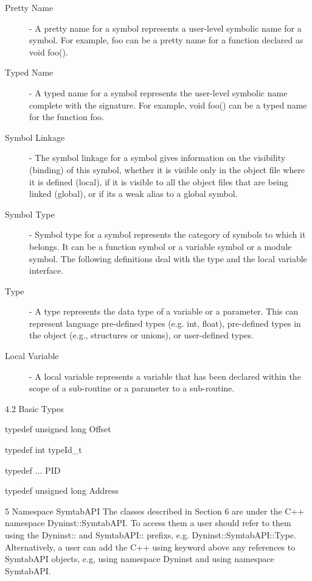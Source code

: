 \begin{description}
\item[Pretty Name] - A pretty name for a symbol represents a user-level symbolic name for a symbol. For example, foo can be a pretty name for a function declared as void foo().
\item[Typed Name] - A typed name for a symbol represents the user-level symbolic name complete with the signature. For example, void foo() can be a typed name for the function foo.
\item[Symbol Linkage] - The symbol linkage for a symbol gives information on the visibility (binding) of this symbol, whether it is visible only in the object file where it is defined (local), if it is visible to all the object files that are being linked (global), or if its a weak alias to a global symbol.
\item[Symbol Type] - Symbol type for a symbol represents the category of symbols to which it belongs. It can be a function symbol or a variable symbol or a module symbol.
The following definitions deal with the type and the local variable interface.
\item[Type] - A type represents the data type of a variable or a parameter. This can represent language pre-defined types (e.g. int, float), pre-defined types in the object (e.g., structures or unions), or user-defined types.
\item[Local Variable] - A local variable represents a variable that has been declared within the scope of a sub-routine or a parameter to a sub-routine.
\end{description}
4.2 Basic Types
\begin{apient}
typedef unsigned long Offset
\end{apient}
\begin{apient}
typedef int typeId_t
\end{apient}
\begin{apient}
typedef ... PID
\end{apient}
\begin{apient}
typedef unsigned long Address
\end{apient}
5 Namespace SymtabAPI
The classes described in Section 6 are under the C++ namespace Dyninst::SymtabAPI. To access them a user should refer to them using the Dyninst:: and SymtabAPI:: prefixs, e.g. Dyninst::SymtabAPI::Type. Alternatively, a user can add the C++ using keyword above any references to SymtabAPI objects, e.g, using namespace Dyninst and using namespace SymtabAPI.

